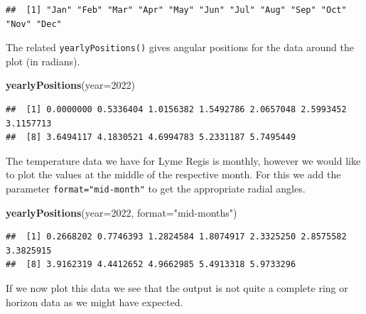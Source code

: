 \documentclass[
]{book}
\newenvironment{Shaded}{\begin{snugshade}}{\end{snugshade}}
\newcommand{\AttributeTok}[1]{\textcolor[rgb]{0.13,0.29,0.53}{#1}}
\newcommand{\DecValTok}[1]{\textcolor[rgb]{0.00,0.00,0.81}{#1}}
\newcommand{\FunctionTok}[1]{\textcolor[rgb]{0.13,0.29,0.53}{\textbf{#1}}}
\newcommand{\NormalTok}[1]{#1}
\newcommand{\StringTok}[1]{\textcolor[rgb]{0.31,0.60,0.02}{#1}}
\begin{document}
\begin{verbatim}
##  [1] "Jan" "Feb" "Mar" "Apr" "May" "Jun" "Jul" "Aug" "Sep" "Oct" "Nov" "Dec"
\end{verbatim}

The related \texttt{yearlyPositions()} gives angular positions for the data around the plot (in radians).

\begin{Shaded}
\begin{Highlighting}[]
\FunctionTok{yearlyPositions}\NormalTok{(}\AttributeTok{year=}\DecValTok{2022}\NormalTok{)}
\end{Highlighting}
\end{Shaded}

\begin{verbatim}
##  [1] 0.0000000 0.5336404 1.0156382 1.5492786 2.0657048 2.5993452 3.1157713
##  [8] 3.6494117 4.1830521 4.6994783 5.2331187 5.7495449
\end{verbatim}

The temperature data we have for Lyme Regis is monthly, however we would like to plot the values at the middle of the respective month. For this we add the parameter \texttt{format="mid-month"} to get the appropriate radial angles.

\begin{Shaded}
\begin{Highlighting}[]
\FunctionTok{yearlyPositions}\NormalTok{(}\AttributeTok{year=}\DecValTok{2022}\NormalTok{, }\AttributeTok{format=}\StringTok{"mid{-}months"}\NormalTok{)}
\end{Highlighting}
\end{Shaded}

\begin{verbatim}
##  [1] 0.2668202 0.7746393 1.2824584 1.8074917 2.3325250 2.8575582 3.3825915
##  [8] 3.9162319 4.4412652 4.9662985 5.4913318 5.9733296
\end{verbatim}

If we now plot this data we see that the output is not quite a complete ring or horizon data as we might have expected.
\end{document}
